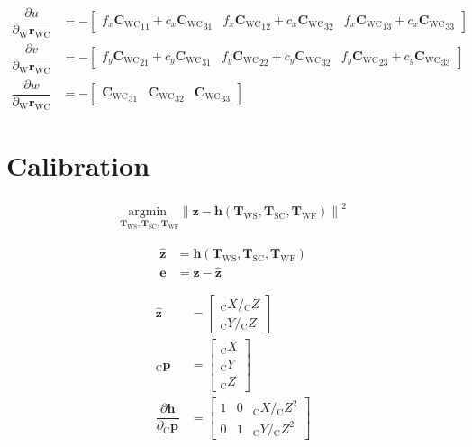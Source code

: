 \documentclass{report}
\renewcommand{\Vec}[1]{{\mathbf{#1}}}
\newcommand{\Mat}[1]{{\mathbf{#1}}}
\newcommand{\Norm}[1]{{\|#1\|}}
\newcommand{\Argmin}[1]{\underset{#1}{{\text{argmin }}}}
\newcommand{\tf}{\mathbf{T}}
\newcommand{\cam}{{\text{C}}}
\newcommand{\sensor}{{\text{S}}}
\newcommand{\world}{{\text{W}}}
\newcommand{\fiducial}{{\text{F}}}
\newcommand{\KineNotationTransform}[3]{{{#1}_{#2#3}}}
\newcommand{\KineNotation}[3]{{{{}_{#2}} {#1}_{#2#3}}}
\newcommand{\KineNotationPart}[3]{{{{}_{#2}} {#1}_{#3}}}
\newcommand{\KineNotationBare}[2]{{{{}_{#2}} {#1}}}
\newcommand{\pos}{{\Vec{r}}}
\newcommand{\Pos}[2]{{\KineNotation{\pos}{#1}{#2}}}
\newcommand{\rot}{{\Mat{C}}}
\newcommand{\Rot}[2]{{\KineNotationTransform{\rot}{#1}{#2}}}
\newcommand{\tf}{{\Mat{T}}}
\newcommand{\Tf}[2]{{\KineNotationTransform{\tf}{#1}{#2}}}
\newcommand{\point}{\Vec{p}}
\newcommand{\Pt}[1]{{\KineNotationPart{\point}{#1}{}}}
\newcommand{\Point}[2]{{\KineNotationBare{\point}{#1}}}
\newcommand{\camRot}{{\Rot{\world}{\cam}}}
\newcommand{\camPos}{{\Pos{\world}{\cam}}}
\newcommand{\projFunc}{{\Vec{h}}}
\newcommand{\measurement}{{\Vec{z}}}
\begin{document}
\begin{align}
  \dfrac{\partial{u}}{\partial{\camPos}} &=
    -\begin{bmatrix}
      f_{x} \camRot_{11} + c_{x} \camRot_{31} &
      f_{x} \camRot_{12} + c_{x} \camRot_{32} &
      f_{x} \camRot_{13} + c_{x} \camRot_{33}
    \end{bmatrix} \\
  \dfrac{\partial{v}}{\partial{\camPos}} &=
    -\begin{bmatrix}
      f_{y} \camRot_{21} + c_{y} \camRot_{31} &
      f_{y} \camRot_{22} + c_{y} \camRot_{32} &
      f_{y} \camRot_{23} + c_{y} \camRot_{33}
    \end{bmatrix} \\
  \dfrac{\partial{w}}{\partial{\camPos}} &=
    -\begin{bmatrix}
      \camRot_{31} &
      \camRot_{32} &
      \camRot_{33}
    \end{bmatrix}
\end{align}



\chapter{Calibration}

\begin{align}
  \Argmin{\Tf{\world}{\sensor}, \Tf{\sensor}{\cam}, \Tf{\world}{\fiducial}}
  \Norm{
    \measurement
    - \projFunc(\Tf{\world}{\sensor}, \Tf{\sensor}{\cam}, \Tf{\world}{\fiducial})
  }^{2}
\end{align}

\begin{align}
  \hat{\measurement} &=
    \projFunc(\Tf{\world}{\sensor},
              \Tf{\sensor}{\cam},
              \Tf{\world}{\fiducial}) \\
  \Vec{e} &= \measurement - \hat{\measurement}
\end{align}

\begin{align}
  \hat{\measurement}
		&=
			\begin{bmatrix}
				\KineNotationBare{X}{\cam} / \KineNotationBare{Z}{\cam} \\
				\KineNotationBare{Y}{\cam} / \KineNotationBare{Z}{\cam}
			\end{bmatrix} \\
  \Point{\cam}{\fiducial_{i}}
		&=
			\begin{bmatrix}
				\KineNotationBare{X}{\cam} \\
				\KineNotationBare{Y}{\cam} \\
				\KineNotationBare{Z}{\cam}
			\end{bmatrix} \\
  \dfrac{\partial{\projFunc}}{\partial{\Pt{\cam}}}
		&=
			\begin{bmatrix}
				1 & 0 & \KineNotationBare{X}{\cam} / \KineNotationBare{Z}{\cam}^{2} \\
				0 & 1 & \KineNotationBare{Y}{\cam} / \KineNotationBare{Z}{\cam}^{2}
			\end{bmatrix}
\end{align}
\end{document}
